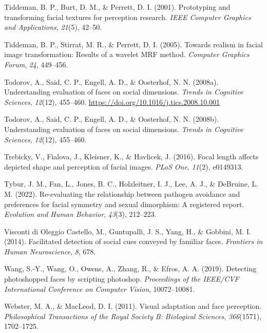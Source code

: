 \documentclass[
  doc,floatsintext]{apa6}
\newlength{\cslhangindent}
\newlength{\cslentryspacingunit} %
\newenvironment{CSLReferences}[2] %
 {%
  \setlength{\parindent}{0pt}
  \ifodd #1
  \let\oldpar\par
  \def\par{\hangindent=\cslhangindent\oldpar}
  \fi
  \setlength{\parskip}{#2\cslentryspacingunit}
 }%
 {}
\begin{document}
\begin{CSLReferences}{1}{0}
\leavevmode{}%
Tiddeman, B. P., Burt, D. M., \& Perrett, D. I. (2001). Prototyping and transforming facial textures for perception research. \emph{IEEE Computer Graphics and Applications}, \emph{21}(5), 42--50.

\leavevmode{}%
Tiddeman, B. P., Stirrat, M. R., \& Perrett, D. I. (2005). Towards realism in facial image transformation: Results of a wavelet MRF method. \emph{Computer Graphics Forum}, \emph{24}, 449--456.

\leavevmode{}%
Todorov, A., Said, C. P., Engell, A. D., \& Oosterhof, N. N. (2008a). Understanding evaluation of faces on social dimensions. \emph{Trends in Cognitive Sciences}, \emph{12}(12), 455--460. \url{https://doi.org/10.1016/j.tics.2008.10.001}

\leavevmode{}%
Todorov, A., Said, C. P., Engell, A. D., \& Oosterhof, N. N. (2008b). Understanding evaluation of faces on social dimensions. \emph{Trends in Cognitive Sciences}, \emph{12}(12), 455--460.

\leavevmode{}%
Trebicky, V., Fialova, J., Kleisner, K., \& Havlicek, J. (2016). Focal length affects depicted shape and perception of facial images. \emph{PLoS One}, \emph{11}(2), e0149313.

\leavevmode{}%
Tybur, J. M., Fan, L., Jones, B. C., Holzleitner, I. J., Lee, A. J., \& DeBruine, L. M. (2022). Re-evaluating the relationship between pathogen avoidance and preferences for facial symmetry and sexual dimorphism: A registered report. \emph{Evolution and Human Behavior}, \emph{43}(3), 212--223.

\leavevmode{}%
Visconti di Oleggio Castello, M., Guntupalli, J. S., Yang, H., \& Gobbini, M. I. (2014). Facilitated detection of social cues conveyed by familiar faces. \emph{Frontiers in Human Neuroscience}, \emph{8}, 678.

\leavevmode{}%
Wang, S.-Y., Wang, O., Owens, A., Zhang, R., \& Efros, A. A. (2019). Detecting photoshopped faces by scripting photoshop. \emph{Proceedings of the IEEE/CVF International Conference on Computer Vision}, 10072--10081.

\leavevmode{}%
Webster, M. A., \& MacLeod, D. I. (2011). Visual adaptation and face perception. \emph{Philosophical Transactions of the Royal Society B: Biological Sciences}, \emph{366}(1571), 1702--1725.


\end{CSLReferences}
\end{document}
